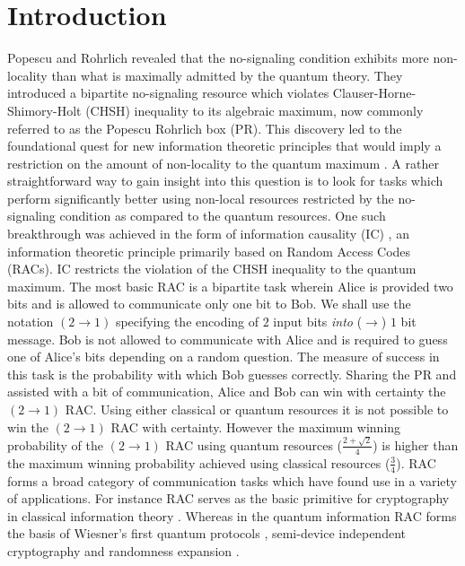 \documentclass[%
 reprint,
 amsmath,amssymb,
 aps,
]{revtex4-1}
\begin{document}
\maketitle

\section{Introduction}
\noindent Popescu and Rohrlich \cite{popescu1994quantum} revealed that the no-signaling condition exhibits more non-locality than what is maximally admitted by the quantum theory. They introduced a bipartite no-signaling resource which violates Clauser-Horne-Shimory-Holt (CHSH) inequality to its algebraic maximum, now commonly referred to as the Popescu Rohrlich box (PR). This discovery led to the foundational quest for new information theoretic principles that would imply a restriction on the amount of non-locality to the quantum maximum \citep{brunner2014bell}. A rather straightforward way to gain insight into this question is to look for tasks which perform significantly better using non-local resources restricted by the no-signaling condition as compared to the quantum resources. One such breakthrough was achieved in the form of information causality (IC) \cite{pawlowski2009information}, an information theoretic principle primarily based on Random Access Codes (RACs). IC  restricts the violation of the CHSH inequality to the quantum maximum. The most basic RAC is a bipartite task wherein Alice is provided two bits and is allowed to communicate only one bit to Bob. We shall use the notation $(2\rightarrow1)$ specifying the encoding of $2$ input bits \textit{into} ($\rightarrow$) $1$ bit message. Bob is not allowed to communicate with Alice and is required to guess one of Alice's bits depending on a random question. The measure of success in this task is the probability with which Bob guesses correctly. Sharing the PR and assisted with a bit of communication, Alice and Bob can win with certainty the $(2 \rightarrow 1)$ RAC. Using either classical or quantum resources it is not possible to win the $(2 \rightarrow 1)$ RAC with certainty. However the maximum winning probability of the $(2 \rightarrow 1)$ RAC using quantum resources ($\frac{2+\sqrt{2}}{4}$) is higher than the maximum winning probability achieved using classical resources ($\frac{3}{4}$). RAC forms a broad category of communication tasks which have found use in a variety of applications. For instance RAC serves as the basic primitive for cryptography in classical information theory \citep{kilian1988founding,crepeau1988achieving}. Whereas in the quantum information RAC forms the basis of Wiesner's first quantum protocols \cite{wiesner1983conjugate,ambainis2002dense}, semi-device independent cryptography \cite{pawlowski2011semi,chaturvedi2015security} and randomness expansion \cite{li2011semi,li2012semi}. \\
\end{document}

